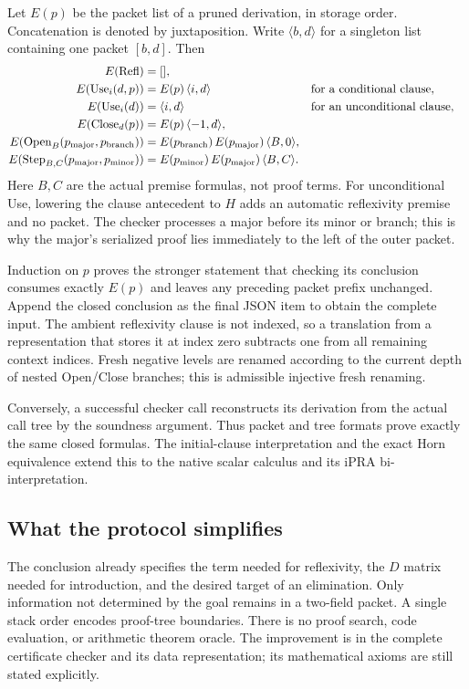 Let \(E(p)\) be the packet list of a pruned derivation, in storage order.
Concatenation is denoted by juxtaposition. Write
\(\langle b,d\rangle\) for a singleton list containing one packet
\([b,d]\). Then
\begin{align*}
 E(\mathrm{Refl})&=[],\\
 E(\mathrm{Use}_i(d,p))&=E(p)\,\langle i,d\rangle
       &&\text{for a conditional clause},\\
 E(\mathrm{Use}_i(d))&=\langle i,d\rangle
       &&\text{for an unconditional clause},\\
 E(\mathrm{Close}_d(p))&=E(p)\,\langle-1,d\rangle,\\
 E(\mathrm{Open}_{B}(p_{\rm major},p_{\rm branch}))
   &=E(p_{\rm branch})\,E(p_{\rm major})\,\langle B,0\rangle,\\
 E(\mathrm{Step}_{B,C}(p_{\rm major},p_{\rm minor}))
   &=E(p_{\rm minor})\,E(p_{\rm major})\,\langle B,C\rangle.
\end{align*}
Here \(B,C\) are the actual premise formulas, not proof terms.
For unconditional Use, lowering the clause antecedent to \(H\) adds
an automatic reflexivity premise and no packet.
The checker processes a major before its minor or branch; this is why
the major's serialized proof lies immediately to the left of the outer
packet.

Induction on \(p\) proves the stronger statement that checking its
conclusion consumes exactly \(E(p)\) and leaves any preceding packet
prefix unchanged. Append the closed conclusion as the final JSON item
to obtain the complete input. The ambient reflexivity clause is not
indexed, so a translation from a representation that stores it at
index zero subtracts one from all remaining context indices.
Fresh negative levels are renamed according to the current depth of
nested Open/Close branches; this is admissible injective fresh renaming.

Conversely, a successful checker call reconstructs its derivation from
the actual call tree by the soundness argument. Thus packet and tree
formats prove exactly the same closed formulas.
The initial-clause interpretation and the exact Horn equivalence extend
this to the native scalar calculus and its iPRA bi-interpretation.

\subsection{What the protocol simplifies}
The conclusion already specifies the term needed for reflexivity,
the \(D\) matrix needed for introduction, and the desired target of an
elimination. Only information not determined by the goal remains in a
two-field packet. A single stack order encodes proof-tree boundaries.
There is no proof search, code evaluation, or arithmetic theorem oracle.
The improvement is in the complete certificate checker and its data
representation; its mathematical axioms are still stated explicitly.

